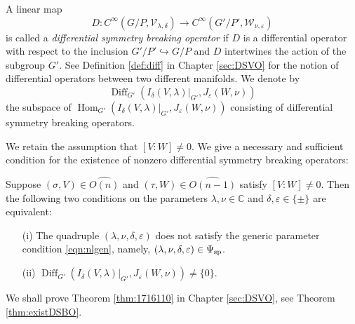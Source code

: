 \begin{definition}
\label{def:DSBO}
A linear map 
\[
   D \colon C^{\infty}(G/P, {\mathcal{V}}_{\lambda,\delta})
     \to 
            C^{\infty}(G'/P', {\mathcal{W}}_{\nu,\varepsilon})
\]
 is called a 
{\it{differential symmetry breaking operator}}
 if $D$ is a differential operator
 with respect to the inclusion $G'/P' \hookrightarrow G/P$
 and $D$ intertwines the action of the subgroup $G'$.  
See Definition \ref{def:diff}
 in Chapter \ref{sec:DSVO}
 for the notion of differential operators
 between two different manifolds.  
We denote by 
\[
{\operatorname{Diff}}_{G'}
   (I_{\delta}(V,\lambda)|_{G'}, J_{\varepsilon}(W,\nu))
\]
 the subspace of 
 ${\operatorname{Hom}}_{G'}
   (I_{\delta}(V,\lambda)|_{G'}, J_{\varepsilon}(W,\nu))$
 consisting of differential symmetry breaking operators.  
\end{definition}

We retain the assumption 
 that $[V:W] \ne 0$.  
We give a necessary and sufficient condition
 for the existence of nonzero differential symmetry breaking operators:
\begin{theorem}
\label{thm:1716110}
Suppose $(\sigma, V) \in \widehat{O(n)}$
 and $(\tau,W) \in \widehat{O(n-1)}$
 satisfy $[V:W] \ne 0$. 
Then the following two conditions
 on the parameters $\lambda, \nu \in {\mathbb{C}}$
 and $\delta, \varepsilon \in \{\pm\}$
 are equivalent:
\begin{enumerate}
\item[{\rm{(i)}}]
The quadruple $(\lambda, \nu, \delta, \varepsilon)$ does not satisfy
 the generic parameter condition \eqref{eqn:nlgen}, 
 namely,
 $(\lambda, \nu, \delta, \varepsilon)\in \Psi_{{\operatorname{sp}}}$.  
\item[{\rm{(ii)}}]
${\operatorname{Diff}}_{G'}
   (I_{\delta}(V,\lambda)|_{G'}, J_{\varepsilon}(W,\nu)) \ne \{0\}.  
$
\end{enumerate}
\end{theorem}

We shall prove Theorem \ref{thm:1716110}
 in Chapter \ref{sec:DSVO},
 see Theorem \ref{thm:existDSBO}.  

\vskip 1pc
